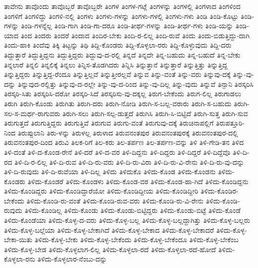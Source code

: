 {ತಾವೇನು
ತಾವೊಂದು
ತಾವೊಬ್ಬರೆ
ತಾವೊಬ್ಬರೇ
ತಿಂಗಳ
ತಿಂಗಳ-ಗಟ್ಲೆ
ತಿಂಗಳನ್ನು
ತಿಂಗಳಲ್ಲಿ
ತಿಂಗಳಾದ
ತಿಂಗಳಿಂದ
ತಿಂಗಳಿಗೆ
ತಿಂಗಳಿದ್ದು
ತಿಂಗಳಿ-ನಲ್ಲಿ
ತಿಂಗಳು
ತಿಂಗಳು-ಗಳನ್ನು
ತಿಂಗಳು-ಗಳಲ್ಲಿ
ತಿಂಗಳು-ಗಳು
ತಿಂಡಿ
ತಿಂಡಿ-ಕೊಟ್ಟು
ತಿಂಡಿ-ಗಳನ್ನು
ತಿಂಡಿ-ಗಳನ್ನೆಲ್ಲ
ತಿಂಡಿ-ಗಾಗಿ
ತಿಂಡಿ-ಗಾ-ದರೂ
ತಿಂಡಿ-ತೀರ್ಥ-ಗಳನ್ನು
ತಿಂಡಿ-ತೀರ್ಥ-ಗಳು
ತಿಂಡಿ-ಯನ್ನು
ತಿಂಡಿ-ಯಾದ
ತಿಂದ
ತಿಂದರು
ತಿಂದರೆ
ತಿಂದಾದ
ತಿಂದಿರ-ಬೇಕು
ತಿಂದಿ-ರ-ಲಿಲ್ಲ
ತಿಂದಿ-ರುವೆ
ತಿಂದು
ತಿಂದು-ಬಿಡುತ್ತಿದ್ದು-ದಾಗಿ
ತಿಂದು-ಹಾಕಿ
ತಿಂದೆವು
ತಿಕ್ಕಿ
ತಿಟ್ಟನ್ನು
ತಿಥಿ
ತಿದ್ದಿ-ಕೊಂಡರು
ತಿದ್ದಿ-ಕೊಳ್ಳಲಾ-ರರು
ತಿದ್ದಿ-ಕೊಳ್ಳುವುದು
ತಿದ್ದಿ-ದರು
ತಿದ್ದುತ್ತಾರೆ
ತಿದ್ದುತ್ತಿದ್ದನು
ತಿದ್ದುತ್ತಿದ್ದರು
ತಿದ್ದುವು-ದ-ರಲ್ಲಿ
ತಿನ್ನದೆ
ತಿನ್ನದೇ
ತಿನ್ನ-ಬಹುದು
ತಿನ್ನ-ಬಹುದೆ
ತಿನ್ನ-ಬೇಕು
ತಿನ್ನಲಾರೆ
ತಿನ್ನಲಿ
ತಿನ್ನಲಿಕ್ಕೆ
ತಿನ್ನಲು
ತಿನ್ನಿಸ-ತೊಡಗಿದರು
ತಿನ್ನಿಸಿ
ತಿನ್ನುತ್ತಾನೆ
ತಿನ್ನುತ್ತಾರೆ
ತಿನ್ನುತ್ತಿತ್ತು
ತಿನ್ನುತ್ತಿದ್ದ
ತಿನ್ನುತ್ತಿದ್ದರು
ತಿನ್ನುತ್ತಿದ್ದ-ರೆಂದೂ
ತಿನ್ನುತ್ತಿಲ್ಲವೆ
ತಿನ್ನುತ್ತೀರಲ್ಲವೆ
ತಿನ್ನುವ
ತಿನ್ನು-ವಂತೆ
ತಿನ್ನು-ವರು
ತಿನ್ನುವು-ದಕ್ಕೆ
ತಿನ್ನು-ವು-ದನ್ನು
ತಿನ್ನುವುದ-ರಲ್ಲಿತ್ತು
ತಿನ್ನುವು-ದ-ರಲ್ಲೇ
ತಿನ್ನು-ವು-ದ-ರಿಂದ
ತಿನ್ನು-ವು-ದಿಲ್ಲ
ತಿನ್ನು-ವುದು
ತಿನ್ನುವೆ
ತಿನ್ಪಾನಿ
ತಿರಸ್ಕರಿಸಿ
ತಿರಸ್ಕರಿ-ಸಿತು
ತಿರಸ್ಕರಿಸಿ-ದರೋ
ತಿರಸ್ಕರಿ-ಸಿದೆ
ತಿರಸ್ಕರಿಸು-ವು-ದಕ್ಕಲ್ಲ
ತಿರುಗ-ಬೇಕೆಂದು
ತಿರುಗ-ಲಿಲ್ಲ
ತಿರುಗಾಡಲು
ತಿರುಗಿ
ತಿರುಗಿ-ಕೊಂಡು
ತಿರುಗಿತು
ತಿರುಗಿ-ದರು
ತಿರುಗಿ-ನೋಡಿ
ತಿರುಗಿ-ಸ-ಬಲ್ಲ-ವರಾರು
ತಿರುಗಿ-ಸ-ಬಹುದು
ತಿರುಗಿ-ಸಲ-ಸ-ಮರ್ಥ-ರಾಗುವರು
ತಿರುಗಿ-ಸಲು
ತಿರುಗಿ-ಸಲ್ಪ-ಡುತ್ತದೆ
ತಿರುಗಿಸಿ
ತಿರುಗಿ-ಸಿ-ಬಿಟ್ಟಿದೆ
ತಿರುಗಿ-ಸುತ್ತ
ತಿರುಗಿ-ಸುವ
ತಿರುಗುತ್ತದೆ
ತಿರುಗುತ್ತಿದ್ದರು
ತಿರುಗುತ್ತಿವೆ
ತಿರುಗುವ
ತಿರುಗು-ವಂತೆ
ತಿರುಗುವು-ದಕ್ಕೆ
ತಿರುಚಿನಾಪಲ್ಲಿಗೆ
ತಿರುಪತ್ತೂರಿ-ನಿಂದ
ತಿರುಪ್ಪುಲಾನಿ
ತಿರು-ಳನ್ನು
ತಿರುಳಲ್ಲ
ತಿರುಳಾದ
ತಿರುವನಂತಪುರ
ತಿರುವನಂತಪುರಕ್ಕೆ
ತಿರುವನಂತಪುರ-ದಲ್ಲಿ
ತಿರುವನಂತಪುರ-ದಿಂದ
ತಿರುವಿ
ತಿಲಕ-ರಿಗೆ
ತಿಲ-ಕರು
ತಿಲ-ತರ್ಪಣ
ತಿಲ-ತರ್ಪಣ-ವನ್ನು
ತಿಳಿ
ತಿಳಿ-ಗೇಡಿ-ತನ
ತಿಳಿದ
ತಿಳಿ-ದಂತೆ
ತಿಳಿ-ದ-ಕೊಂಡ-ರೇನೆ
ತಿಳಿ-ದರೆ
ತಿಳಿ-ದ-ವರ
ತಿಳಿ-ದಿದ್ದನು
ತಿಳಿ-ದಿದ್ದರು
ತಿಳಿ-ದಿದ್ದರೆ
ತಿಳಿ-ದಿದ್ದೆವೊ
ತಿಳಿ-ದಿ-ರದ
ತಿಳಿ-ದಿ-ರ-ಲಿಲ್ಲ
ತಿಳಿ-ದಿ-ರುವ
ತಿಳಿ-ದಿ-ರು-ವರು
ತಿಳಿ-ದಿ-ರು-ವಿರಾ
ತಿಳಿ-ದಿ-ರು-ವಿ-ರೇನು
ತಿಳಿ-ದಿ-ರು-ವು-ದನ್ನು
ತಿಳಿ-ದಿ-ರುವುದು
ತಿಳಿ-ದಿ-ರುವೆಯಾ
ತಿಳಿ-ದಿಲ್ಲ
ತಿಳಿದು
ತಿಳಿದುಕೊ
ತಿಳಿದು-ಕೊಂಡ
ತಿಳಿದು-ಕೊಂಡನು
ತಿಳಿದು-ಕೊಂಡರು
ತಿಳಿದು-ಕೊಂಡರೆ
ತಿಳಿದು-ಕೊಂಡಳು
ತಿಳಿದು-ಕೊಂಡ-ವರ
ತಿಳಿದು-ಕೊಂಡ-ಹಾ-ಗಿದೆ
ತಿಳಿದು-ಕೊಂಡಿದ್ದನು
ತಿಳಿದು-ಕೊಂಡಿದ್ದರು
ತಿಳಿದು-ಕೊಂಡಿದ್ದಾರೆಯೋ
ತಿಳಿದು-ಕೊಂಡಿದ್ದೀಯ
ತಿಳಿದು-ಕೊಂಡಿದ್ದೀರಿ
ತಿಳಿದು-ಕೊಂಡಿರ-ಬೇಕೆಂದು
ತಿಳಿದು-ಕೊಂಡಿ-ರು-ವಂತೆ
ತಿಳಿದು-ಕೊಂಡಿ-ರುವ-ವರು
ತಿಳಿದು-ಕೊಂಡಿ-ರು-ವಿ-ರೇನು
ತಿಳಿದು-ಕೊಂಡಿ-ರುವುದು
ತಿಳಿದು-ಕೊಂಡಿಲ್ಲ
ತಿಳಿದು-ಕೊಂಡು
ತಿಳಿದು-ಕೊಂಡು-ಬಿಟ್ಟಿದ್ದರು
ತಿಳಿದು-ಕೊಂಡು-ಬಿಟ್ಟೆ
ತಿಳಿದು-ಕೊಂಡೆ
ತಿಳಿದು-ಕೊಂಡೆಯಾ
ತಿಳಿದು-ಕೊಳ್ಳ-ದ-ವರು
ತಿಳಿದು-ಕೊಳ್ಳ-ಬಲ್ಲ
ತಿಳಿದು-ಕೊಳ್ಳ-ಬಲ್ಲದ್ದಾಗಿತ್ತು
ತಿಳಿದು-ಕೊಳ್ಳ-ಬಲ್ಲರು
ತಿಳಿದು-ಕೊಳ್ಳ-ಬಲ್ಲೆಯಾ
ತಿಳಿದು-ಕೊಳ್ಳ-ಬೇಕಾಗಿದೆ
ತಿಳಿದು-ಕೊಳ್ಳ-ಬೇಕಾದ
ತಿಳಿದು-ಕೊಳ್ಳ-ಬೇಕಾದರೆ
ತಿಳಿದು-ಕೊಳ್ಳ-ಬೇಕಾ-ಯಿತು
ತಿಳಿದು-ಕೊಳ್ಳ-ಬೇಕು
ತಿಳಿದು-ಕೊಳ್ಳ-ಬೇಕೆಂದು
ತಿಳಿದು-ಕೊಳ್ಳ-ಬೇಕೆಂದೂ
ತಿಳಿದು-ಕೊಳ್ಳ-ಬೇಕೆಂಬ
ತಿಳಿದು-ಕೊಳ್ಳ-ಬೇಡ
ತಿಳಿದು-ಕೊಳ್ಳಲಾಗ-ಲಿಲ್ಲ
ತಿಳಿದು-ಕೊಳ್ಳಲಾ-ರದೆ
ತಿಳಿದು-ಕೊಳ್ಳಲಾ-ರದೆ-ಹೋದೆ
ತಿಳಿದು-ಕೊಳ್ಳಲಾ-ರನು
ತಿಳಿದು-ಕೊಳ್ಳಲಾರ-ನೆಂಬು-ದನ್ನು
}
